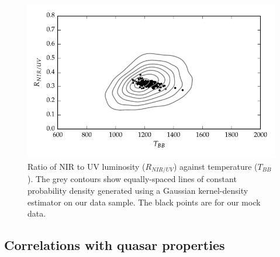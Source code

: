 \begin{figure}
  \centering
  \includegraphics[width=\textwidth]{figures/chapter05/ratio_tbb_contours.pdf}
  \caption{Ratio of \ac{NIR} to UV luminosity ($R_{NIR/UV}$) against temperature ($T_{BB}$). The grey contours show equally-spaced lines of constant probability density generated using a Gaussian kernel-density estimator on our data sample. The black points are for our mock data.}
  \label{fig:ratio_tbb_contours}
\end{figure}

\subsection{Correlations with quasar properties}

